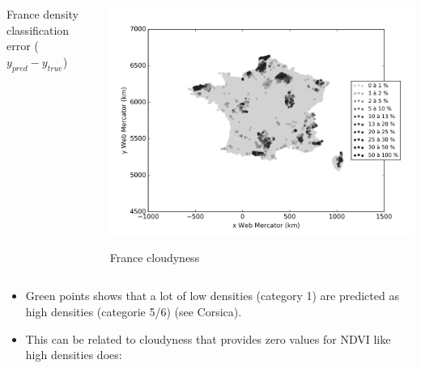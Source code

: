 \documentclass[c]{beamer}
\begin{document}
\begin{frame}
\begin{columns}
 \begin{column}{0.5\textwidth}
  \begin{overlayarea}{\linewidth}{4cm}
    \centering\vfill
  \end{overlayarea}
  \begin{overlayarea}{\linewidth}{0.5cm}
    \centering
    \tiny France density classification error ($y_{pred}-y_{true}$)\par
  \end{overlayarea}
 \end{column}
 \begin{column}{0.5\textwidth}
  \begin{overlayarea}{\linewidth}{4cm}
    \centering\vfill
    \includegraphics[scale=0.25]{../../data/France/test/Neural_Network_Classification-oversampling/Neural_Network_Classification-oversampling/density_covering.png}
  \end{overlayarea}
  \begin{overlayarea}{\linewidth}{0.5cm}
    \centering
    \tiny France cloudyness\par
  \end{overlayarea}
 \end{column}
\end{columns}
{\tiny
\begin{itemize}
\item Green points shows that a lot of low densities (category 1) are predicted as high densities (categorie 5/6) (see Corsica). 
\item This can be related to cloudyness that provides zero values for NDVI like high densities does:
\end{itemize}
\begin{columns}



\end{columns}}
\end{frame}
\end{document}
